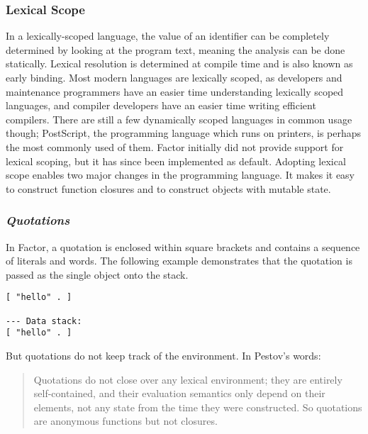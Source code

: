 \documentclass{sig-alternate}
\begin{document}
\subsubsection{Lexical Scope}
In a lexically-scoped language, the value of an identifier can be completely determined by looking at the program text, meaning the analysis can be done statically. Lexical resolution is determined at compile time and is also known as early binding.  Most modern languages are lexically scoped, as developers and maintenance programmers have an easier time understanding lexically scoped languages, and compiler developers have an easier time writing efficient compilers.  There are still a few dynamically scoped languages in common usage though; PostScript, the programming language which runs on printers, is perhaps the most commonly used of them.  Factor initially did not provide support for lexical scoping, but it has since been implemented as default. Adopting lexical scope enables two major changes in the programming language.  It makes it easy to construct function closures and to construct objects with mutable state.

\subsubsection*{\textit{Quotations}}

In Factor, a quotation is enclosed within square brackets and contains a sequence of literals and words.  The following example demonstrates that the quotation is passed as the single object onto the stack.

\begin{verbatim}
[ "hello" . ]

--- Data stack:
[ "hello" . ]
\end{verbatim}

But quotations do not keep track of the environment. In Pestov's words:
\begin{quotation}
Quotations do not close over any lexical environment; they are entirely self-contained, and their evaluation semantics only depend on their elements, not any state from the time they were constructed.  So quotations are anonymous functions but not closures.
\end{quotation}
\end{document}
